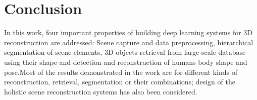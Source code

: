\chapter{Conclusion}

In this work, four important properties of building deep learning systems for 3D reconstruction are addressed: 
Scene capture and data preprocessing, hierarchical segmentation of scene elements, 3D objects retrieval from large scale database using their shape and detection and reconstruction of humans body shape and pose.Most of the results demonstrated in the work are for different kinds of reconstruction, retrieval, segmentation or their combinations; design of the holistic scene reconstruction systems has also been considered.


